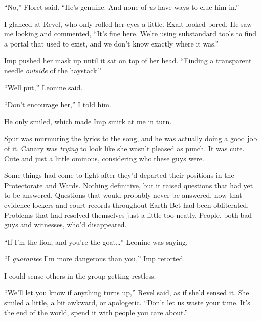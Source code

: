 ``No,'' Floret said.  ``He's genuine.  And none of \emph{us} have ways to clue him in.''



I glanced at Revel, who only rolled her eyes a little.  Exalt looked bored.  He saw me looking and commented, ``It's fine here.  We're using substandard tools to find a portal that used to exist, and we don't know exactly where it was.''



Imp pushed her mask up until it sat on top of her head.  ``Finding a transparent needle \emph{outside} of the haystack.''



``Well put,'' Leonine said.



``Don't encourage her,'' I told him.



He only smiled, which made Imp smirk at me in turn.



Spur was murmuring the lyrics to the song, and he was actually doing a good job of it.  Canary was \emph{trying} to look like she wasn't pleased as punch.  It was cute.  Cute and just a little ominous, considering who these guys were.



Some things had come to light after they'd departed their positions in the Protectorate and Wards.  Nothing definitive, but it raised questions that had yet to be answered.  Questions that would probably never be answered, now that evidence lockers and court records throughout Earth Bet had been obliterated.  Problems that had resolved themselves just a little too neatly.  People, both bad guys and witnesses, who'd disappeared.



``If I'm the lion, and you're the goat\ldots'' Leonine was saying.



``I \emph{guarantee} I'm more dangerous than you,'' Imp retorted.



I could sense others in the group getting restless.



``We'll let you know if anything turns up,'' Revel said, as if she'd sensed it.  She smiled a little, a bit awkward, or apologetic.  ``Don't let us waste your time.  It's the end of the world, spend it with people you care about.''



